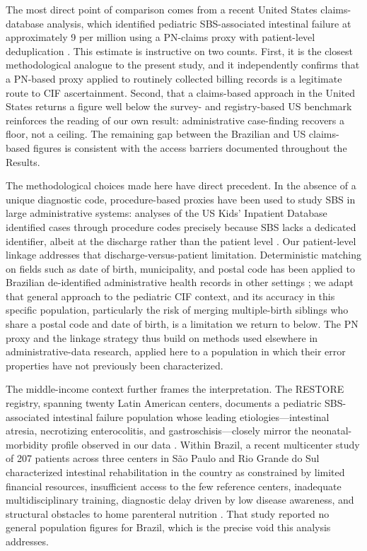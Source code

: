 \documentclass[12pt,a4paper]{article}
\theoremstyle{plain}
\theoremstyle{definition}
\theoremstyle{remark}
\begin{document}
The most direct point of comparison comes from a recent United States claims-database analysis, which identified pediatric SBS-associated intestinal failure at approximately 9 per million using a PN-claims proxy with patient-level deduplication \cite{ali2025epidemiology}. This estimate is instructive on two counts. First, it is the closest methodological analogue to the present study, and it independently confirms that a PN-based proxy applied to routinely collected billing records is a legitimate route to CIF ascertainment. Second, that a claims-based approach in the United States returns a figure well below the survey- and registry-based US benchmark reinforces the reading of our own result: administrative case-finding recovers a floor, not a ceiling. The remaining gap between the Brazilian and US claims-based figures is consistent with the access barriers documented throughout the Results.

The methodological choices made here have direct precedent. In the absence of a unique diagnostic code, procedure-based proxies have been used to study SBS in large administrative systems: analyses of the US Kids' Inpatient Database identified cases through procedure codes precisely because SBS lacks a dedicated identifier, albeit at the discharge rather than the patient level \cite{pant2017epidemiology}. Our patient-level linkage addresses that discharge-versus-patient limitation. Deterministic matching on fields such as date of birth, municipality, and postal code has been applied to Brazilian de-identified administrative health records in other settings \cite{medinacoeli2025deterministic}; we adapt that general approach to the pediatric CIF context, and its accuracy in this specific population, particularly the risk of merging multiple-birth siblings who share a postal code and date of birth, is a limitation we return to below. The PN proxy and the linkage strategy thus build on methods used elsewhere in administrative-data research, applied here to a population in which their error properties have not previously been characterized.

The middle-income context further frames the interpretation. The RESTORE registry, spanning twenty Latin American centers, documents a pediatric SBS-associated intestinal failure population whose leading etiologies---intestinal atresia, necrotizing enterocolitis, and gastroschisis---closely mirror the neonatal-morbidity profile observed in our data \cite{rumbo2024restore}. Within Brazil, a recent multicenter study of 207 patients across three centers in São Paulo and Rio Grande do Sul characterized intestinal rehabilitation in the country as constrained by limited financial resources, insufficient access to the few reference centers, inadequate multidisciplinary training, diagnostic delay driven by low disease awareness, and structural obstacles to home parenteral nutrition \cite{leite2025multicenter}. That study reported no general population figures for Brazil, which is the precise void this analysis addresses.
\end{document}
